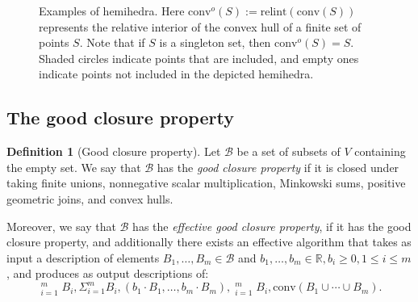 \documentclass[10pt]{amsart}
\theoremstyle{plain}
\theoremstyle{definition}
\newtheorem{definition}[lemma]{Definition}
\let\leq\leqslant
\let\geq\geqslant
\providecommand{\Cplus}[0]{\ensuremath{\mathop{\widehat{\bigoplus}}}\xspace}
\providecommand{\Cmult}[0]{\ensuremath{\mathop{\mathring{\bigstar}}}\xspace}
\providecommand{\conv}[1]{\ensuremath{\mathrm{conv}{\left({#1}\right)}\xspace}}
\providecommand{\convo}[1]{\ensuremath{\mathrm{conv}^o{\left({#1}\right)}\xspace}}
\providecommand{\relint}[1]{\ensuremath{\mathrm{relint}{\left({#1}\right)}\xspace}}
\begin{document}
\begin{figure}[htp]
    \caption{Examples of hemihedra.
        Here $\convo S:= \relint{\conv{S}}$ represents the relative interior of the convex hull of a finite set of points $S$.
        Note that if $S$ is a singleton set, then $\convo S = S$.
        Shaded circles indicate points that are included, and empty ones indicate points not included in the depicted hemihedra.
    }
    \label{fig:hemihedra-eg}
\end{figure}

\subsection{The good closure property}
\label{subsec:good-closure-property}
\begin{definition}[Good closure property]
\label{def:property:closure}
Let $\mathcal{B}$ be a set of subsets of $V$ containing the empty set. We say that $\mathcal{B}$ has 
the \emph{good closure property} if it is closed under taking
    finite unions, nonnegative scalar multiplication, Minkowski sums, positive geometric joins, and convex hulls.

Moreover, we say that $\mathcal{B}$ has the \emph{effective good closure property},
if it has the good closure property, and additionally there exists an effective algorithm
that takes as input a description of elements $B_1,\ldots,B_m \in \mathcal{B}$ and $b_1,\ldots,b_m \in \mathbb{R}, b_i \geq 0,1 \leq i \leq m$,
and produces as output descriptions of:
\begin{equation}
\label{eqn:def:good-closure-property}
\Cplus_{i=1}^m B_i, \Sigma_{i=1}^{m} B_i, (b_1 \cdot B_1,\ldots,b_m \cdot B_m),
\Cmult_{i=1}^m B_i, \conv{B_1 \cup \cdots \cup B_m}.
\end{equation}
\end{definition}
\end{document}
